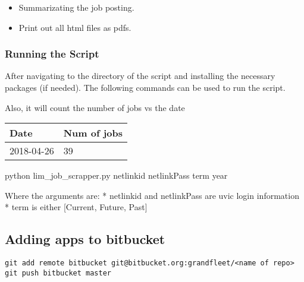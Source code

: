 \begin{itemize}

\item
  Summarizating the job posting.
\item
  Print out all html files as pdfs.
\end{itemize}


\subsubsection{Running the Script}\label{running-the-script}

After navigating to the directory of the script and installing the
necessary packages (if needed). The following commands can be used to
run the script.

Also, it will count the number of jobs vs the date

\begin{longtable}[]{@{}ll@{}}
\toprule
\begin{minipage}[b]{0.20\columnwidth}\raggedright
Date\strut
\end{minipage} & \begin{minipage}[b]{0.21\columnwidth}\raggedright
Num of jobs\strut
\end{minipage}\tabularnewline
\midrule
\endhead
\begin{minipage}[t]{0.20\columnwidth}\raggedright
2018-04-26\strut
\end{minipage} & \begin{minipage}[t]{0.21\columnwidth}\raggedright
39\strut
\end{minipage}\tabularnewline
\bottomrule
\end{longtable}

\begin{Shaded}
python  lim\_job\_scrapper.py netlinkid netlinkPass term year 
\end{Shaded}

Where the arguments are: * netlinkid and netlinkPass are uvic login
information * term is either {[}Current, Future, Past{]}

\subsection{Adding apps to bitbucket}\label{adding-apps-to-bitbucket}

\begin{verbatim}
git add remote bitbucket git@bitbucket.org:grandfleet/<name of repo>
git push bitbucket master
\end{verbatim}


